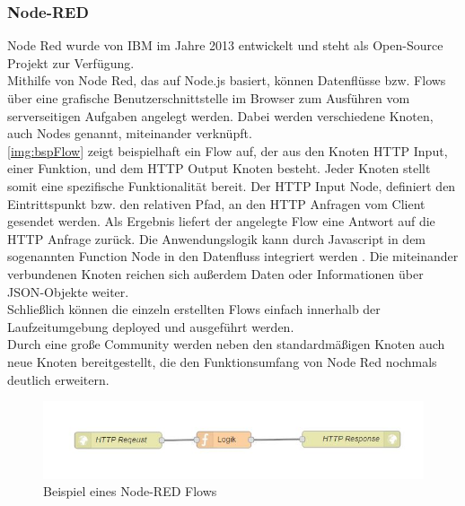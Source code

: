 \subsubsection{Node-RED}
Node Red wurde von IBM im Jahre 2013 entwickelt und steht als Open-Source Projekt zur Verfügung\cite{nodeRed:nodeRedAbout}.\\
Mithilfe von Node Red, das auf Node.js basiert, können Datenflüsse bzw. Flows über eine grafische Benutzerschnittstelle im Browser zum Ausführen vom serverseitigen Aufgaben angelegt werden. Dabei werden verschiedene Knoten, auch Nodes genannt, miteinander verknüpft. \\\autoref{img:bspFlow} zeigt beispielhaft ein Flow auf, der aus den Knoten \acf{HTTP} Input, einer Funktion, und dem \ac{HTTP} Output Knoten besteht. Jeder Knoten stellt somit eine spezifische Funktionalität bereit. Der \ac{HTTP} Input Node, definiert den Eintrittspunkt bzw. den relativen Pfad, an den \ac{HTTP} Anfragen vom Client gesendet werden. Als Ergebnis liefert der angelegte Flow eine Antwort auf die \ac{HTTP} Anfrage zurück. Die Anwendungslogik kann durch Javascript in dem sogenannten Function Node in den Datenfluss integriert werden . Die miteinander verbundenen Knoten reichen sich außerdem Daten oder Informationen über \ac{JSON}-Objekte weiter.
\\Schließlich können die einzeln erstellten Flows einfach innerhalb der Laufzeitumgebung deployed und ausgeführt werden. \\Durch eine große Community werden neben den standardmäßigen Knoten auch neue Knoten bereitgestellt, die den Funktionsumfang von Node Red nochmals deutlich erweitern\cite{nodeRed:nodeRed}.
\begin{figure}[H]
	\centering	
	\includegraphics[scale=0.8]{images/bspFlow}
	\caption{Beispiel eines Node-RED Flows}
	\label{img:bspFlow}
\end{figure}




